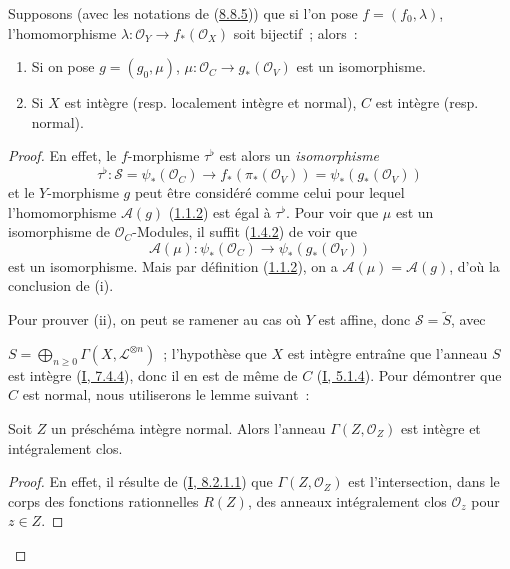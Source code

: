 \begin{proposition}[8.8.6]
\label{II.8.8.6-fr}
Supposons (avec les notations de (\hyperref[II.8.8.5-fr]{8.8.5})) que si
l'on pose $f=(f_0,\lambda)$, l'homomorphisme
$\lambda:\mathcal{O}_Y\to f_*(\mathcal{O}_X)$ soit bijectif~; alors~:
\begin{enumerate}
  \item[\rm{(i)}] Si on pose $g=(g_0,\mu)$,
  $\mu:\mathcal{O}_C\to g_*(\mathcal{O}_V)$ est un isomorphisme.
  \item[\rm{(ii)}] Si $X$ est intègre (resp. localement intègre et normal),
  $C$ est intègre (resp. normal).
\end{enumerate}
\end{proposition}

\begin{proof}
En effet, le $f$-morphisme $\tau^\flat$ est alors un \emph{isomorphisme}
\[
  \tau^\flat:\mathcal{S}=\psi_*(\mathcal{O}_C)
  \longrightarrow f_*(\pi_*(\mathcal{O}_V))
  =\psi_*(g_*(\mathcal{O}_V))
\]
et le $Y$-morphisme $g$ peut être considéré comme celui pour lequel
l'homomorphisme $\mathcal{A}(g)$
(\hyperref[II.1.1.2-fr]{1.1.2}) est égal à $\tau^\flat$. Pour voir que
$\mu$ est un isomorphisme de $\mathcal{O}_C$-Modules, il suffit
(\hyperref[II.1.4.2-fr]{1.4.2}) de voir que
\[
  \mathcal{A}(\mu):\psi_*(\mathcal{O}_C)
  \longrightarrow\psi_*(g_*(\mathcal{O}_V))
\]
est un isomorphisme. Mais par définition
(\hyperref[II.1.1.2-fr]{1.1.2}), on a
$\mathcal{A}(\mu)=\mathcal{A}(g)$, d'où la conclusion de (i).

Pour prouver (ii), on peut se ramener au cas où $Y$ est affine, donc
$\mathcal{S}=\widetilde{S}$, avec

$S=\bigoplus_{n\geqslant 0}\Gamma(X,\mathcal{L}^{\otimes n})$~;
l'hypothèse que $X$ est intègre entraîne que l'anneau $S$ est intègre
(\hyperref[I.7.4.4-fr]{I, 7.4.4}), donc il en est de même de $C$
(\hyperref[I.5.1.4-fr]{I, 5.1.4}). Pour démontrer que $C$ est normal, nous
utiliserons le lemme suivant~:

\begin{lemma}[8.8.6.1]
\label{II.8.8.6.1-fr}
Soit $Z$ un préschéma intègre normal. Alors l'anneau
$\Gamma(Z,\mathcal{O}_Z)$ est intègre et intégralement clos.
\end{lemma}

\begin{proof}
En effet, il résulte de
(\hyperref[I.8.2.1.1-fr]{I, 8.2.1.1}) que
$\Gamma(Z,\mathcal{O}_Z)$ est l'intersection, dans le corps des fonctions
rationnelles $R(Z)$, des anneaux intégralement clos $\mathcal{O}_z$ pour
$z\in Z$.
\end{proof}


\end{proof}
